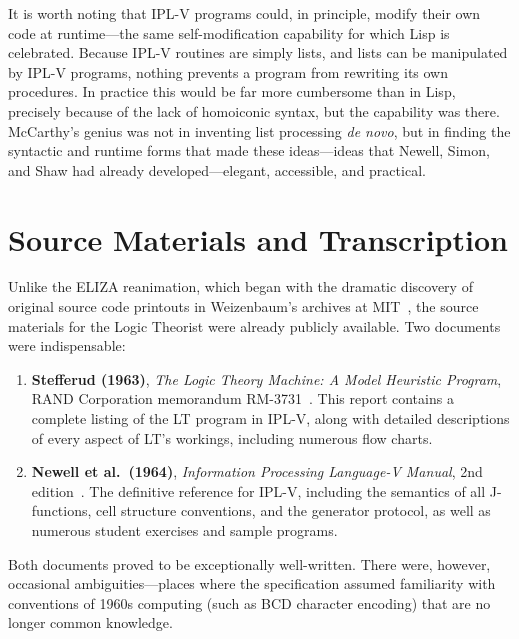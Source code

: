 \documentclass[journal]{IEEEtran}
\begin{document}
It is worth noting that IPL-V programs could, in principle, modify
their own code at runtime---the same self-modification capability for
which Lisp is celebrated. Because IPL-V routines are simply lists, and
lists can be manipulated by IPL-V programs, nothing prevents a program
from rewriting its own procedures. In practice this would be far more
cumbersome than in Lisp, precisely because of the lack of homoiconic
syntax, but the capability was there. McCarthy's genius was not in
inventing list processing \textit{de novo}, but in finding the
syntactic and runtime forms that made these ideas---ideas that Newell,
Simon, and Shaw had already developed---elegant, accessible, and
practical. 

\section{Source Materials and Transcription}
\label{sec:sources}

Unlike the ELIZA reanimation, which began with the dramatic discovery
of original source code printouts in Weizenbaum's archives at
MIT~\cite{lane2025eliza}, the source materials for the Logic Theorist
were already publicly available. Two documents were indispensable:

\begin{enumerate}
\item \textbf{Stefferud (1963)}, \textit{The Logic Theory Machine: A
  Model Heuristic Program}, RAND Corporation memorandum
  RM-3731~\cite{stefferud1963lt}. This report contains a complete
  listing of the LT program in IPL-V, along with detailed descriptions
  of every aspect of LT's workings, including numerous flow charts.

\item \textbf{Newell et al.\ (1964)}, \textit{Information Processing
  Language-V Manual}, 2nd edition~\cite{newell1964ipl}. The definitive
  reference for IPL-V, including the semantics of all J-functions,
  cell structure conventions, and the generator protocol, as well as
  numerous student exercises and sample programs.
\end{enumerate}

Both documents proved to be exceptionally well-written. There were,
however, occasional ambiguities---places where the specification
assumed familiarity with conventions of 1960s computing (such as BCD
character encoding) that are no longer common knowledge.
\end{document}
